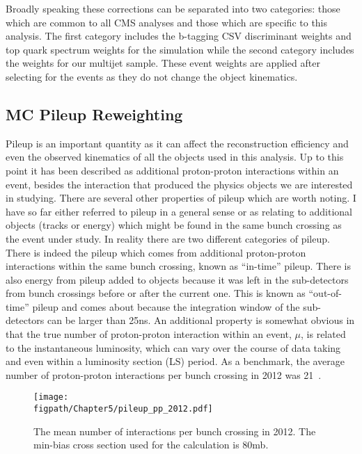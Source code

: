 Broadly speaking these corrections can be separated into two categories: those which are common to all CMS analyses and those which are specific to this analysis.
The first category includes the b-tagging CSV discriminant weights and top quark \pt spectrum weights for the \ttbar simulation while the second category includes the weights for our multijet sample.
These event weights are applied after selecting for the events as they do not change the object kinematics.

\subsection{MC Pileup Reweighting}

Pileup is an important quantity as it can affect the reconstruction efficiency and even the observed kinematics of all the objects used in this analysis.
Up to this point it has been described as additional proton-proton interactions within an event, besides the interaction that produced the physics objects we are interested in studying.
There are several other properties of pileup which are worth noting.
I have so far either referred to pileup in a general sense or as relating to additional objects (tracks or energy) which might be found in the same bunch crossing as the event under study.
In reality there are two different categories of pileup.
There is indeed the pileup which comes from additional proton-proton interactions within the same bunch crossing, known as ``in-time'' pileup.
There is also energy from pileup added to objects because it was left in the sub-detectors from bunch crossings before or after the current one.
This is known as ``out-of-time'' pileup and comes about because the integration window of the sub-detectors can be larger than 25\unit{ns}.
An additional property is somewhat obvious in that the true number of proton-proton interaction within an event, $\mu$, is related to the instantaneous luminosity, which can vary over the course of data taking and even within a luminosity section (LS) period.
As a benchmark, the average number of proton-proton interactions per bunch crossing in 2012 was 21~\cite{LumiPublic}.

\begin{figure}[!hbt]
    \centering
    \texttt{[image: \\figpath/Chapter5/pileup\_pp\_2012.pdf]}
    \caption{The mean number of interactions per bunch crossing in 2012. The min-bias cross section used for the calculation is 80\unit{mb}.}
    \label{fig:pileup_pp_2012}
\end{figure}

